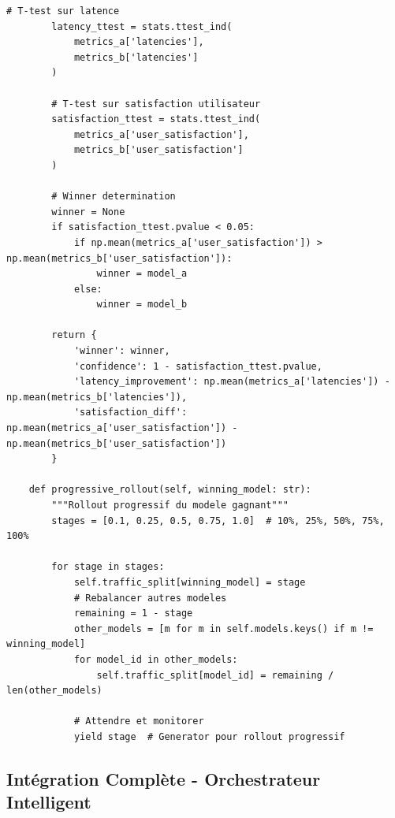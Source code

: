 \documentclass[12pt,a4paper]{article}
\begin{document}
\begin{lstlisting}[caption={A/B Testing Framework}]
        # T-test sur latence
        latency_ttest = stats.ttest_ind(
            metrics_a['latencies'],
            metrics_b['latencies']
        )
        
        # T-test sur satisfaction utilisateur
        satisfaction_ttest = stats.ttest_ind(
            metrics_a['user_satisfaction'],
            metrics_b['user_satisfaction']
        )
        
        # Winner determination
        winner = None
        if satisfaction_ttest.pvalue < 0.05:
            if np.mean(metrics_a['user_satisfaction']) > np.mean(metrics_b['user_satisfaction']):
                winner = model_a
            else:
                winner = model_b
                
        return {
            'winner': winner,
            'confidence': 1 - satisfaction_ttest.pvalue,
            'latency_improvement': np.mean(metrics_a['latencies']) - np.mean(metrics_b['latencies']),
            'satisfaction_diff': np.mean(metrics_a['user_satisfaction']) - np.mean(metrics_b['user_satisfaction'])
        }
        
    def progressive_rollout(self, winning_model: str):
        """Rollout progressif du modele gagnant"""
        stages = [0.1, 0.25, 0.5, 0.75, 1.0]  # 10%, 25%, 50%, 75%, 100%
        
        for stage in stages:
            self.traffic_split[winning_model] = stage
            # Rebalancer autres modeles
            remaining = 1 - stage
            other_models = [m for m in self.models.keys() if m != winning_model]
            for model_id in other_models:
                self.traffic_split[model_id] = remaining / len(other_models)
                
            # Attendre et monitorer
            yield stage  # Generator pour rollout progressif
\end{lstlisting}

\subsection{Intégration Complète - Orchestrateur Intelligent}
\end{document}
